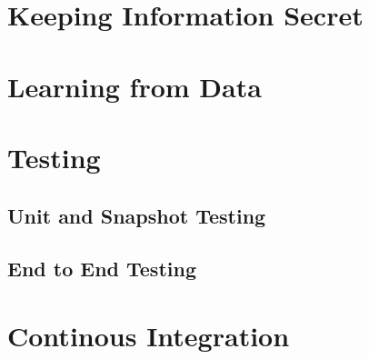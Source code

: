 
\section{Keeping Information Secret}


\section{Learning from Data}


\section{Testing}

\subsection{Unit and Snapshot Testing}


\subsection{End to End Testing}


\section{Continous Integration}

